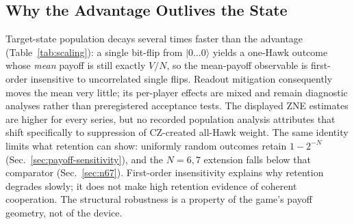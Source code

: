 \documentclass[conference,letterpaper,10pt]{IEEEtran}
\newcommand{\ket}[1]{\ensuremath{|#1\rangle}}
\begin{document}
\subsection{Why the Advantage Outlives the State}\label{sec:outlives}
Target-state population decays several times faster than the advantage
(Table~\ref{tab:scaling}): a single bit-flip from $\ket{0\ldots0}$ yields a
one-Hawk outcome whose \emph{mean} payoff is still exactly $V/N$, so the
mean-payoff observable is first-order insensitive to uncorrelated single
flips. Readout mitigation consequently moves the mean very little; its
per-player effects are mixed and remain diagnostic analyses rather than
preregistered acceptance tests. The displayed ZNE estimates are higher for
every series, but no recorded population analysis attributes that shift
specifically to suppression of CZ-created all-Hawk weight. The same identity
limits what retention can show: uniformly random outcomes retain $1-2^{-N}$
(Sec.~\ref{sec:payoff-sensitivity}), and the $N=6,7$ extension falls below
that comparator (Sec.~\ref{sec:n67}). First-order insensitivity explains why
retention degrades slowly; it does not make high retention evidence of
coherent cooperation. The structural robustness is a property of the game's
payoff geometry, not of the device.
\end{document}
